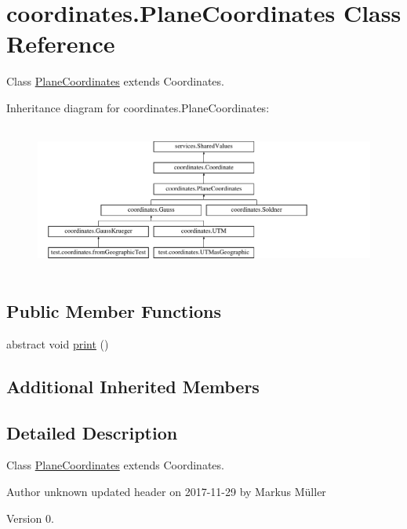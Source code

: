 \hypertarget{classcoordinates_1_1_plane_coordinates}{}\section{coordinates.\+Plane\+Coordinates Class Reference}
\label{classcoordinates_1_1_plane_coordinates}


Class \hyperlink{classcoordinates_1_1_plane_coordinates}{Plane\+Coordinates} extends Coordinates.  


Inheritance diagram for coordinates.\+Plane\+Coordinates\+:\begin{figure}[H]
\begin{center}
\leavevmode
\includegraphics[height=4.933921cm]{classcoordinates_1_1_plane_coordinates}
\end{center}
\end{figure}
\subsection*{Public Member Functions}
\begin{DoxyCompactItemize}
\item 
abstract void \hyperlink{classcoordinates_1_1_plane_coordinates_a6079b694d771b1f70de8f0e5c3e5e03f}{print} ()
\end{DoxyCompactItemize}
\subsection*{Additional Inherited Members}


\subsection{Detailed Description}
Class \hyperlink{classcoordinates_1_1_plane_coordinates}{Plane\+Coordinates} extends Coordinates. 

\begin{DoxyAuthor}{Author}
unknown  updated header on 2017-\/11-\/29 by Markus Müller 
\end{DoxyAuthor}
\begin{DoxyVersion}{Version}
0. 
\end{DoxyVersion}


